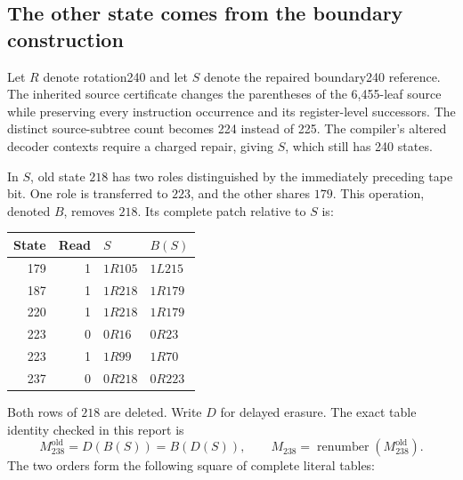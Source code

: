 \subsection{The other state comes from the boundary construction}

Let $R$ denote rotation240 and let $S$ denote the repaired boundary240
reference. The inherited source certificate changes the parentheses of
the 6,455-leaf source while preserving every instruction occurrence and
its register-level successors. The distinct source-subtree count becomes
224 instead of 225. The compiler's altered decoder contexts require a
charged repair, giving $S$, which still has 240 states.

In $S$, old state $218$ has two roles distinguished by the immediately
preceding tape bit. One role is transferred to $223$, and the other
shares $179$. This operation, denoted $B$, removes $218$. Its complete
patch relative to $S$ is:

\begin{center}
\begin{tabular}{rrll}
\toprule
State&Read&$S$&$B(S)$\\
\midrule
179&1&$1R105$&$1L215$\\
187&1&$1R218$&$1R179$\\
220&1&$1R218$&$1R179$\\
223&0&$0R16$&$0R23$\\
223&1&$1R99$&$1R70$\\
237&0&$0R218$&$0R223$\\
\bottomrule
\end{tabular}
\end{center}

Both rows of $218$ are deleted. Write $D$ for delayed erasure. The exact
table identity checked in this report is
\[
                 M_{238}^{\mathrm{old}}=D(B(S))=B(D(S)),
 \qquad M_{238}=\operatorname{renumber}(M_{238}^{\mathrm{old}}).
\]
The two orders form the following square of complete literal tables:

\begin{center}
\end{center}

